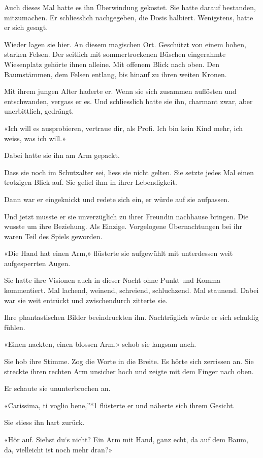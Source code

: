 Auch dieses Mal hatte es ihn Überwindung gekostet. Sie hatte darauf
bestanden, mitzumachen. Er schliesslich nachgegeben, die Dosis halbiert.
Wenigstens, hatte er sich gesagt.

Wieder lagen sie hier. An diesem magischen Ort. Geschützt von einem
hohen, starken Felsen. Der seitlich mit sommertrockenen Büschen
eingerahmte Wiesenplatz gehörte ihnen alleine. Mit offenem Blick nach
oben. Den Baumstämmen, dem Felsen entlang, bis hinauf zu ihren weiten
Kronen.

Mit ihrem jungen Alter haderte er. Wenn sie sich zusammen auflösten und
entschwanden, vergass er es. Und schliesslich hatte sie ihn, charmant
zwar, aber unerbittlich, gedrängt.

«Ich will es ausprobieren, vertraue dir, als Profi. Ich bin kein Kind
mehr, ich weiss, was ich will.»

Dabei hatte sie ihn am Arm gepackt.

Dass sie noch im Schutzalter sei, liess sie nicht gelten. Sie setzte
jedes Mal einen trotzigen Blick auf. Sie gefiel ihm in ihrer
Lebendigkeit.

Dann war er eingeknickt und redete sich ein, er würde auf sie aufpassen.

Und jetzt musste er sie unverzüglich zu ihrer Freundin nachhause
bringen. Die wusste um ihre Beziehung. Als Einzige. Vorgelogene
Übernachtungen bei ihr waren Teil des Spiels geworden.

«Die Hand hat einen Arm,» flüsterte sie aufgewühlt mit unterdessen weit
aufgesperrten Augen.

Sie hatte ihre Visionen auch in dieser Nacht ohne Punkt und Komma
kommentiert. Mal lachend, weinend, schreiend, schluchzend. Mal staunend.
Dabei war sie weit entrückt und zwischendurch zitterte sie.

Ihre phantastischen Bilder beeindruckten ihn. Nachträglich würde er sich
schuldig fühlen.

«Einen nackten, einen blossen Arm,» schob sie langsam nach.

Sie hob ihre Stimme. Zog die Worte in die Breite. Es hörte sich
zerrissen an. Sie streckte ihren rechten Arm unsicher hoch und zeigte
mit dem Finger nach oben.

Er schaute sie ununterbrochen an.

«Carissima, ti voglio bene,''*1 flüsterte er und näherte sich ihrem
Gesicht.

Sie stiess ihn hart zurück.

«Hör auf. Siehst du`s nicht? Ein Arm mit Hand, ganz echt, da auf dem
Baum, da, vielleicht ist noch mehr dran?»


